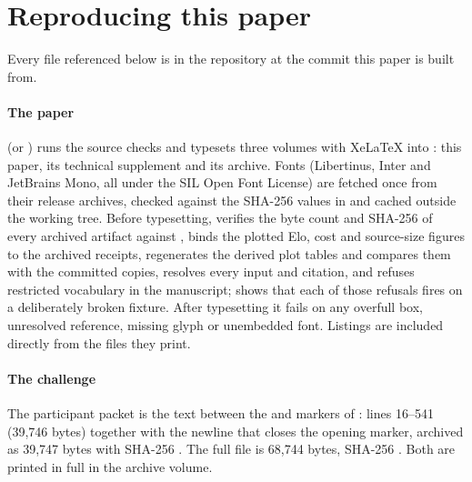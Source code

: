 \section{Reproducing this paper}
\label{app:repro}

Every file referenced below is in the repository at the commit this paper is built from.

\paragraph{The paper}  (or ) runs the source
checks and typesets three volumes with XeLaTeX into : this paper,
its technical supplement and its archive. Fonts (Libertinus, Inter and JetBrains Mono, all under the
SIL Open Font License) are fetched once from their release archives, checked against the SHA-256
values in  and cached outside the working tree. Before typesetting,
 verifies the byte count and SHA-256 of every archived artifact against
, binds the plotted Elo, cost and source-size figures to the
archived receipts, regenerates the derived plot tables and compares them with the committed copies,
resolves every input and citation, and refuses restricted vocabulary in the manuscript;
 shows that each of those refusals fires on a deliberately broken fixture.
After typesetting it fails on any overfull box, unresolved reference, missing glyph or unembedded
font. Listings are included directly from the files they print.

\paragraph{The challenge} The participant packet is the text between the  and 
markers of : lines 16--541 (39,746 bytes)
together with the newline that closes the opening marker, archived as 39,747 bytes with SHA-256
. The full file is 68,744 bytes, SHA-256 .
Both are printed in full in the archive volume.

